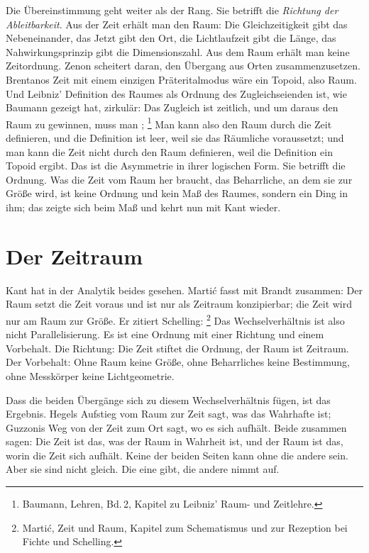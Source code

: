 Die Übereinstimmung geht weiter als der Rang. Sie betrifft die \emph{Richtung der Ableitbarkeit}. Aus der Zeit erhält man den Raum: Die Gleichzeitigkeit gibt das Nebeneinander, das Jetzt gibt den Ort, die Lichtlaufzeit gibt die Länge, das Nahwirkungsprinzip gibt die Dimensionszahl. Aus dem Raum erhält man keine Zeitordnung. Zenon scheitert daran, den Übergang aus Orten zusammenzusetzen. Brentanos Zeit mit einem einzigen Präteritalmodus wäre ein Topoid, also Raum. Und Leibniz' Definition des Raumes als Ordnung des Zugleichseienden ist, wie Baumann gezeigt hat, zirkulär: Das Zugleich ist zeitlich, und um daraus den Raum zu gewinnen, muss man ; \footnote{Baumann, Lehren, Bd.\,2, Kapitel zu Leibniz' Raum- und Zeitlehre.} Man kann also den Raum durch die Zeit definieren, und die Definition ist leer, weil sie das Räumliche voraussetzt; und man kann die Zeit nicht durch den Raum definieren, weil die Definition ein Topoid ergibt. Das ist die Asymmetrie in ihrer logischen Form. Sie betrifft die Ordnung. Was die Zeit vom Raum her braucht, das Beharrliche, an dem sie zur Größe wird, ist keine Ordnung und kein Maß des Raumes, sondern ein Ding in ihm; das zeigte sich beim Maß und kehrt nun mit Kant wieder.

\section{Der Zeitraum}

Kant hat in der Analytik beides gesehen. Martić fasst mit Brandt zusammen: Der Raum setzt die Zeit voraus und ist nur als Zeitraum konzipierbar; die Zeit wird nur am Raum zur Größe. Er zitiert Schelling: \footnote{Martić, Zeit und Raum, Kapitel zum Schematismus und zur Rezeption bei Fichte und Schelling.} Das Wechselverhältnis ist also nicht Parallelisierung. Es ist eine Ordnung mit einer Richtung und einem Vorbehalt. Die Richtung: Die Zeit stiftet die Ordnung, der Raum ist Zeitraum. Der Vorbehalt: Ohne Raum keine Größe, ohne Beharrliches keine Bestimmung, ohne Messkörper keine Lichtgeometrie.

Dass die beiden Übergänge sich zu diesem Wechselverhältnis fügen, ist das Ergebnis. Hegels Aufstieg vom Raum zur Zeit sagt, was das Wahrhafte ist; Guzzonis Weg von der Zeit zum Ort sagt, wo es sich aufhält. Beide zusammen sagen: Die Zeit ist das, was der Raum in Wahrheit ist, und der Raum ist das, worin die Zeit sich aufhält. Keine der beiden Seiten kann ohne die andere sein. Aber sie sind nicht gleich. Die eine gibt, die andere nimmt auf.
